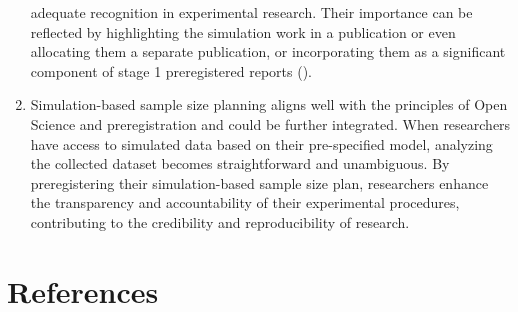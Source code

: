 \documentclass[
  man,
  floatsintext,
  longtable,
  a4paper,
  nolmodern,
  notxfonts,
  notimes,
  colorlinks=true,linkcolor=blue,citecolor=blue,urlcolor=blue]{apa7}
\begin{document}
\begin{enumerate}
  adequate recognition in experimental research. Their importance can be
  reflected by highlighting the simulation work in a publication or even
  allocating them a separate publication, or incorporating them as a
  significant component of stage 1 preregistered reports
  ().
\item
  Simulation-based sample size planning aligns well with the principles
  of Open Science and preregistration and could be further integrated.
  When researchers have access to simulated data based on their
  pre-specified model, analyzing the collected dataset becomes
  straightforward and unambiguous. By preregistering their
  simulation-based sample size plan, researchers enhance the
  transparency and accountability of their experimental procedures,
  contributing to the credibility and reproducibility of research.
\end{enumerate}

\section{References}\label{references}
\end{document}

